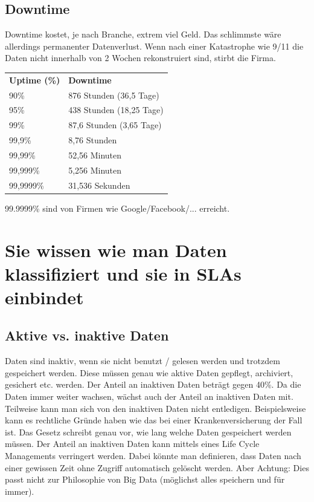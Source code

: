 \subsection{Downtime}
Downtime kostet, je nach Branche, extrem viel Geld. Das schlimmste wäre allerdings permanenter Datenverlust. Wenn nach einer Katastrophe wie 9/11 die Daten nicht innerhalb von 2 Wochen rekonstruiert sind, stirbt die Firma.
\begin{table}[h]
	\begin{tabular}{ll}
		\textbf{Uptime (\%)} & \textbf{Downtime}        \\
		90\%                 & 876 Stunden (36,5 Tage)  \\
		95\%                 & 438 Stunden (18,25 Tage) \\
		99\%                 & 87,6 Stunden (3,65 Tage) \\
		99,9\%               & 8,76 Stunden             \\
		99,99\%              & 52,56 Minuten            \\
		99,999\%             & 5,256 Minuten            \\
		99,9999\%            & 31,536 Sekunden         
	\end{tabular}
\end{table}
		99.9999\% sind von Firmen wie Google/Facebook/... erreicht.

\section{Sie wissen wie man Daten klassifiziert und sie in SLAs einbindet}

\subsection{Aktive vs. inaktive Daten}
Daten sind inaktiv, wenn sie nicht benutzt / gelesen werden und trotzdem gespeichert werden. Diese müssen genau wie aktive Daten gepflegt, archiviert, gesichert etc. werden.
Der Anteil an inaktiven Daten beträgt gegen 40\%. Da die Daten immer weiter wachsen, wächst auch der Anteil an inaktiven Daten mit. Teilweise kann man sich von den inaktiven Daten nicht entledigen. Beispielsweise kann es rechtliche Gründe haben wie das bei einer Krankenversicherung der Fall ist. Das Gesetz schreibt genau vor, wie lang welche Daten gespeichert werden müssen.
Der Anteil an inaktiven Daten kann mittels eines Life Cycle Managements verringert werden. Dabei könnte man definieren, dass Daten nach einer gewissen Zeit ohne Zugriff automatisch gelöscht werden. Aber Achtung: Dies passt nicht zur Philosophie von Big Data (möglichst alles speichern und für immer).

